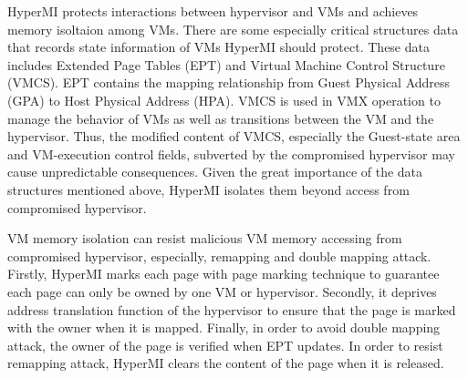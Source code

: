 \documentclass[conference]{IEEEtran}
\begin{document}
HyperMI protects interactions between hypervisor and VMs and achieves memory isoltaion among VMs. 
There are some especially critical structures data that records state information of VMs HyperMI should protect. These data includes Extended Page Tables (EPT) and Virtual Machine Control Structure (VMCS). EPT contains the mapping relationship from Guest Physical Address (GPA) to Host Physical Address (HPA). 
VMCS is used in VMX operation to manage the behavior of VMs as well as transitions between the VM and the hypervisor. Thus, the modified content of VMCS, especially the Guest-state area and VM-execution control fields, subverted by the compromised hypervisor may cause unpredictable consequences. %
Given the great importance of the data structures mentioned above, HyperMI isolates them beyond access from compromised hypervisor.

VM memory isolation can resist malicious VM memory accessing from compromised hypervisor, especially, remapping and double mapping attack.
Firstly, HyperMI marks each page with page marking technique to guarantee each page can only be owned by one VM or hypervisor.
Secondly, it deprives address translation function of the hypervisor to ensure that the page is marked with the owner when it is mapped. 
Finally, in order to avoid double mapping attack, the owner of the page is verified when EPT updates.
In order to resist remapping attack, HyperMI clears the content of the page when it is released.
\end{document}
